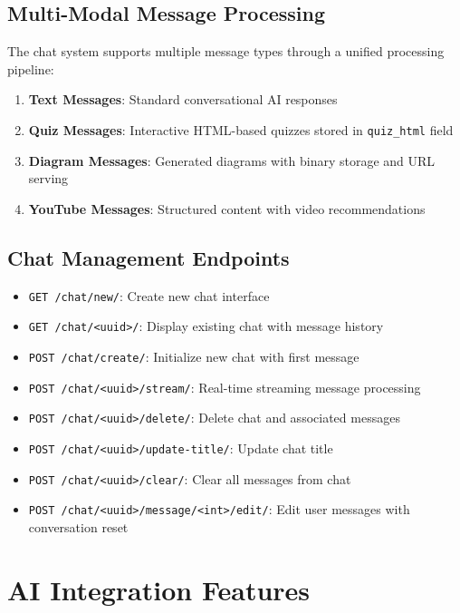\documentclass[12pt,a4paper]{article}
\begin{document}
\subsection{Multi-Modal Message Processing}

The chat system supports multiple message types through a unified processing pipeline:

\begin{enumerate}
    \item \textbf{Text Messages}: Standard conversational AI responses
    \item \textbf{Quiz Messages}: Interactive HTML-based quizzes stored in \texttt{quiz\_html} field
    \item \textbf{Diagram Messages}: Generated diagrams with binary storage and URL serving
    \item \textbf{YouTube Messages}: Structured content with video recommendations
\end{enumerate}

\subsection{Chat Management Endpoints}

\begin{itemize}
    \item \texttt{GET /chat/new/}: Create new chat interface
    \item \texttt{GET /chat/<uuid>/}: Display existing chat with message history
    \item \texttt{POST /chat/create/}: Initialize new chat with first message
    \item \texttt{POST /chat/<uuid>/stream/}: Real-time streaming message processing
    \item \texttt{POST /chat/<uuid>/delete/}: Delete chat and associated messages
    \item \texttt{POST /chat/<uuid>/update-title/}: Update chat title
    \item \texttt{POST /chat/<uuid>/clear/}: Clear all messages from chat
    \item \texttt{POST /chat/<uuid>/message/<int>/edit/}: Edit user messages with conversation reset
\end{itemize}

\section{AI Integration Features}
\end{document}
